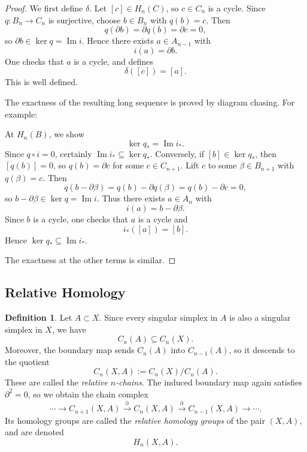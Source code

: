 \documentclass[11pt,a4paper]{article}
\theoremstyle{definition}
\newtheorem{definition}{Definition}[section]
\theoremstyle{plain}
\theoremstyle{remark}
\newcommand{\1}{\mathbbm{1}}
\begin{document}
\begin{proof}
    We first define $\delta$. Let $[c]\in H_n(C)$, so $c\in C_n$ is a cycle. Since $q\colon B_n\to C_n$ is surjective,
    choose $b\in B_n$ with $q(b)=c$. Then
    \[
    q(\partial b)=\partial q(b)=\partial c=0,
    \]
    so $\partial b\in \ker q = \operatorname{Im} i$. Hence there exists $a\in A_{n-1}$ with
    \[
    i(a)=\partial b.
    \]
    One checks that $a$ is a cycle, and defines
    \[
    \delta([c])=[a].
    \]
    This is well defined.

    The exactness of the resulting long sequence is proved by diagram chasing. For example:

    At $H_n(B)$, we show
    \[
    \ker q_* = \operatorname{Im} i_*.
    \]
    Since $q\circ i=0$, certainly $\operatorname{Im} i_*\subseteq \ker q_*$. Conversely, if $[b]\in \ker q_*$, then
    $[q(b)]=0$, so $q(b)=\partial c$ for some $c\in C_{n+1}$. Lift $c$ to some $\beta\in B_{n+1}$ with $q(\beta)=c$.
    Then
    \[
    q(b-\partial \beta)=q(b)-\partial q(\beta)=q(b)-\partial c=0,
    \]
    so $b-\partial\beta \in \ker q=\operatorname{Im} i$. Thus there exists $a\in A_n$ with
    \[
    i(a)=b-\partial\beta.
    \]
    Since $b$ is a cycle, one checks that $a$ is a cycle and
    \[
    i_*([a])=[b].
    \]
    Hence $\ker q_* \subseteq \operatorname{Im} i_*$.

    The exactness at the other terms is similar.
\end{proof}

\subsection{Relative Homology}

\begin{definition}
    Let $A\subset X$. Since every singular simplex in $A$ is also a singular simplex in $X$, we have
    \[
    C_n(A)\subseteq C_n(X).
    \]
    Moreover, the boundary map sends $C_n(A)$ into $C_{n-1}(A)$, so it descends to the quotient
    \[
    C_n(X,A):=C_n(X)/C_n(A).
    \]
    These are called the \emph{relative $n$-chains}. The induced boundary map again satisfies $\partial^2=0$, so we obtain
    the chain complex
    \[
    \cdots \to C_{n+1}(X,A)\xrightarrow{\partial} C_n(X,A)\xrightarrow{\partial} C_{n-1}(X,A)\to \cdots.
    \]
    Its homology groups are called the \emph{relative homology groups} of the pair $(X,A)$, and are denoted
    \[
    H_n(X,A).
    \]
\end{definition}
\end{document}
